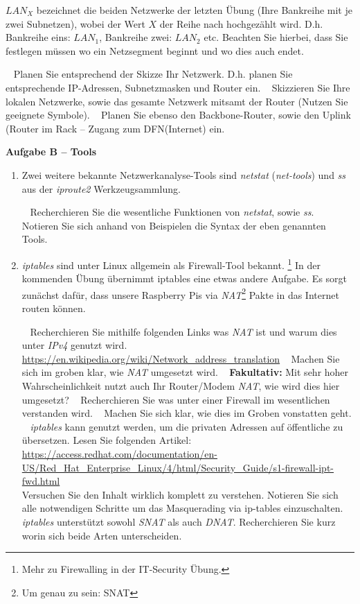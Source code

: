\documentclass[paper=a4,fontsize=11pt]{scrartcl}%
\numberwithin{equation}{section}
\begin{document}
$LAN_X$ bezeichnet die beiden Netzwerke der letzten Übung (Ihre Bankreihe mit je zwei Subnetzen), wobei der Wert $X$ der Reihe nach hochgezählt wird. D.h. Bankreihe eins: $LAN_{1}$, Bankreihe zwei: $LAN_{2}$ etc. Beachten Sie hierbei, dass Sie festlegen müssen wo ein Netzsegment beginnt und wo dies auch endet. 
\begin{tasks}
		\task~ Planen Sie entsprechend der Skizze Ihr Netzwerk. D.h. planen Sie entsprechende IP-Adressen, Subnetzmasken und Router ein.
		\task~ Skizzieren Sie Ihre lokalen Netzwerke, sowie das gesamte Netzwerk mitsamt der Router (Nutzen Sie geeignete Symbole).
		\task~ Planen Sie ebenso den Backbone-Router, sowie den Uplink (Router im Rack -- Zugang zum DFN(Internet) ein.
	\end{tasks}
	
\begin{center}\Large{\textbf{Aufgabe B -- Tools}}\end{center}\vskip0.25in
\begin{enumerate}
	\item Zwei weitere bekannte Netzwerkanalyse-Tools sind \emph{netstat} (\emph{net-tools}) und \emph{ss} aus der \emph{iproute2} Werkzeugsammlung.
\begin{tasks}
		\task~ Recherchieren Sie die wesentliche Funktionen von \emph{netstat}, sowie \emph{ss}.
		\task~ Notieren Sie sich anhand von Beispielen die Syntax der eben genannten Tools. 
	\end{tasks}
	\item \emph{iptables} sind unter Linux allgemein als Firewall-Tool bekannt. \footnote{Mehr zu Firewalling in der IT-Security Übung.} In der kommenden Übung übernimmt iptables eine etwas andere Aufgabe. Es sorgt zunächst dafür, dass unsere Raspberry Pis via \emph{NAT}\footnote{Um genau zu sein: SNAT} Pakte in das Internet routen können.
	\begin{tasks}
		\task~ Recherchieren Sie mithilfe folgenden Links was \emph{NAT} ist und warum dies unter \emph{IPv4} genutzt wird.\\
		\url{https://en.wikipedia.org/wiki/Network_address_translation}
		\task~ Machen Sie sich im groben klar, wie \emph{NAT} umgesetzt wird. 
		\task~ \textbf{Fakultativ:} Mit sehr hoher Wahrscheinlichkeit nutzt auch Ihr Router/Modem \emph{NAT}, wie wird dies hier umgesetzt?
		\task~ Recherchieren Sie was unter einer Firewall im wesentlichen verstanden wird.
		\task~ Machen Sie sich klar, wie dies im Groben vonstatten geht.
		\task~ \emph{iptables} kann genutzt werden, um die privaten Adressen auf öffentliche zu übersetzen. Lesen Sie folgenden Artikel:\\
		\url{https://access.redhat.com/documentation/en-US/Red_Hat_Enterprise_Linux/4/html/Security_Guide/s1-firewall-ipt-fwd.html}\\
		Versuchen Sie den Inhalt wirklich komplett zu verstehen. Notieren Sie sich alle notwendigen Schritte um das Masquerading via ip-tables einzuschalten.
		\task~ \emph{iptables} unterstützt sowohl \emph{SNAT} als auch \emph{DNAT}. Recherchieren Sie kurz worin sich beide Arten unterscheiden.
	\end{tasks}
\end{enumerate}
\end{document}
